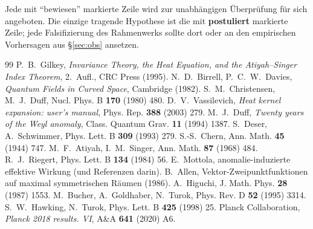 \documentclass[11pt,a4paper]{article}
\theoremstyle{definition}
\theoremstyle{remark}
\begin{document}
\noindent
Jede mit ``bewiesen'' markierte Zeile wird zur unabhängigen Überprüfung für sich angeboten. Die
einzige tragende Hypothese ist die mit \textbf{postuliert} markierte Zeile; jede Falsifizierung des
Rahmenwerks sollte dort oder an den empirischen Vorhersagen aus \S\ref{sec:obs} ansetzen.

\begin{thebibliography}{99}
 P.~B.~Gilkey, \emph{Invariance Theory, the Heat Equation, and the
Atiyah--Singer Index Theorem}, 2.~Aufl., CRC Press (1995).
 N.~D.~Birrell, P.~C.~W.~Davies, \emph{Quantum Fields in Curved Space},
Cambridge (1982).
 S.~M.~Christensen, M.~J.~Duff, Nucl. Phys. B \textbf{170} (1980) 480.
 D.~V.~Vassilevich, \emph{Heat kernel expansion: user's manual}, Phys.
Rep. \textbf{388} (2003) 279.
 M.~J.~Duff, \emph{Twenty years of the Weyl anomaly}, Class. Quantum Grav.
\textbf{11} (1994) 1387.
 S.~Deser, A.~Schwimmer, Phys. Lett. B \textbf{309} (1993) 279.
 S.-S.~Chern, Ann. Math. \textbf{45} (1944) 747.
 M.~F.~Atiyah, I.~M.~Singer, Ann. Math. \textbf{87} (1968) 484.
 R.~J.~Riegert, Phys. Lett. B \textbf{134} (1984) 56.
 E.~Mottola, anomalie-induzierte effektive Wirkung (und Referenzen darin).
 B.~Allen, Vektor-Zweipunktfunktionen auf maximal symmetrischen Räumen (1986).
 A.~Higuchi, J. Math. Phys. \textbf{28} (1987) 1553.
 M.~Bucher, A.~Goldhaber, N.~Turok, Phys. Rev. D \textbf{52} (1995) 3314.
 S.~W.~Hawking, N.~Turok, Phys. Lett. B \textbf{425} (1998) 25.
 Planck Collaboration, \emph{Planck 2018 results. VI}, A\&A \textbf{641} (2020) A6.
\end{thebibliography}
\end{document}
